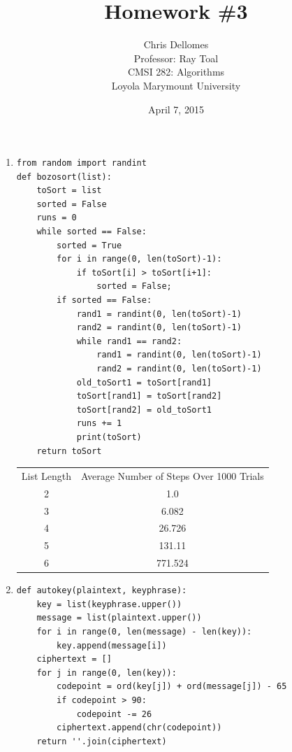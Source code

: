 \documentclass{article}
\begin{document}
\title{Homework \#3}
\author{Chris Dellomes\\
Professor: Ray Toal\\
CMSI 282: Algorithms\\
Loyola Marymount University}

\date{April 7, 2015}

\maketitle

\clearpage
\begin{enumerate}
	\item \begin{lstlisting}
from random import randint
def bozosort(list):
    toSort = list
    sorted = False
    runs = 0
    while sorted == False:
        sorted = True
        for i in range(0, len(toSort)-1):
            if toSort[i] > toSort[i+1]:
                sorted = False;
        if sorted == False:
            rand1 = randint(0, len(toSort)-1)
            rand2 = randint(0, len(toSort)-1)
            while rand1 == rand2:
                rand1 = randint(0, len(toSort)-1)
                rand2 = randint(0, len(toSort)-1)
            old_toSort1 = toSort[rand1]
            toSort[rand1] = toSort[rand2]
            toSort[rand2] = old_toSort1
            runs += 1
            print(toSort)
    return toSort
    \end{lstlisting}

    \begin{center}
    \begin{tabular}{c c}
    List Length & Average Number of Steps Over 1000 Trials\\
    2 & 1.0\\
    3 & 6.082\\
    4 & 26.726\\
    5 & 131.11\\
    6 & 771.524
    \end{tabular}
    \end{center}


    \item \begin{lstlisting}
def autokey(plaintext, keyphrase):
    key = list(keyphrase.upper())
    message = list(plaintext.upper())
    for i in range(0, len(message) - len(key)):
        key.append(message[i])
    ciphertext = []
    for j in range(0, len(key)):
        codepoint = ord(key[j]) + ord(message[j]) - 65
        if codepoint > 90:
            codepoint -= 26
        ciphertext.append(chr(codepoint))
    return ''.join(ciphertext)
	\end{lstlisting}


\end{enumerate}
\end{document}
